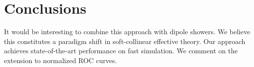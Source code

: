 \section{Conclusions}\label{sec:conclusions}

It would be interesting to combine this approach with dipole showers. We
believe this constitutes a paradigm shift in soft-collinear effective
theory. Our approach achieves state-of-the-art performance on fast
simulation. We comment on the extension to normalized ROC curves.

